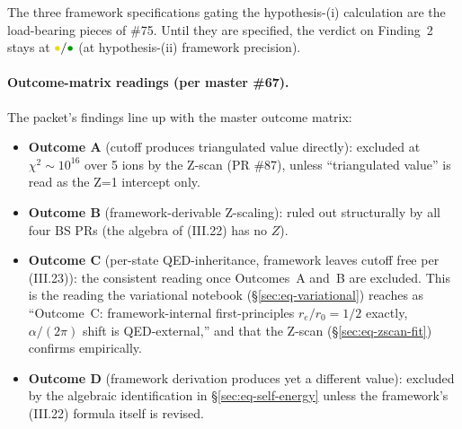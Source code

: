 The three framework specifications gating the hypothesis-(i) calculation are
the load-bearing pieces of \#75. Until they are specified, the verdict on
Finding~2 stays at $\mathbin{\hbox{\color{yellow!90!black}\(\bullet\)}}/
\mathbin{\hbox{\color{green!60!black}\(\bullet\)}}$
(at hypothesis-(ii) framework precision).

\paragraph{Outcome-matrix readings (per master \#67).}
The packet's findings line up with the master outcome matrix:
\begin{itemize}[topsep=2pt,itemsep=0pt]
  \item \textbf{Outcome A} (cutoff produces triangulated value directly):
        excluded at $\chi^2 \sim 10^{16}$ over 5 ions by the Z-scan
        (PR \#87), unless ``triangulated value'' is read as the Z=1
        intercept only.
  \item \textbf{Outcome B} (framework-derivable Z-scaling): ruled out
        structurally by all four BS PRs (the algebra of (III.22) has no $Z$).
  \item \textbf{Outcome C} (per-state QED-inheritance, framework leaves
        cutoff free per (III.23)): the consistent reading once Outcomes~A
        and~B are excluded. This is the reading the variational notebook
        (\S\ref{sec:eq-variational}) reaches as ``Outcome~C: framework-internal
        first-principles $r_e/r_0 = 1/2$ exactly, $\alpha/(2\pi)$ shift is
        QED-external,'' and that the Z-scan (\S\ref{sec:eq-zscan-fit})
        confirms empirically.
  \item \textbf{Outcome D} (framework derivation produces yet a different
        value): excluded by the algebraic identification in
        \S\ref{sec:eq-self-energy} unless the framework's (III.22) formula
        itself is revised.
\end{itemize}

